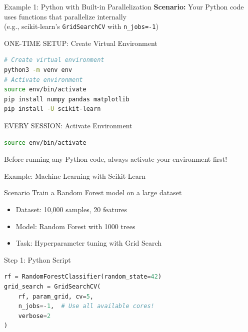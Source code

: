 \documentclass[aspectratio=169]{beamer}
\begin{document}
\begin{frame}[fragile]{Example 1: Python with Built-in Parallelization}
\textbf{Scenario:} Your Python code uses functions that parallelize internally\\
(e.g., scikit-learn's \texttt{GridSearchCV} with \texttt{n\_jobs=-1})

\begin{block}{ONE-TIME SETUP: Create Virtual Environment}
\begin{lstlisting}[language=bash]
# Create virtual environment
python3 -m venv env
# Activate environment
source env/bin/activate
pip install numpy pandas matplotlib
pip install -U scikit-learn
\end{lstlisting}
\end{block}

\begin{alertblock}{EVERY SESSION: Activate Environment}
\begin{lstlisting}[language=bash]
source env/bin/activate
\end{lstlisting}
Before running any Python code, always activate your environment first!
\end{alertblock}

\end{frame}

\begin{frame}{Example: Machine Learning with Scikit-Learn}
\begin{block}{Scenario}
Train a Random Forest model on a large dataset
\begin{itemize}
    \item Dataset: 10,000 samples, 20 features
    \item Model: Random Forest with 1000 trees
    \item Task: Hyperparameter tuning with Grid Search
\end{itemize}
\end{block}

\end{frame}

\begin{frame}[fragile]{Step 1: Python Script}
\begin{lstlisting}[language=Python]
rf = RandomForestClassifier(random_state=42)
grid_search = GridSearchCV(
    rf, param_grid, cv=5, 
    n_jobs=-1,  # Use all available cores!
    verbose=2
)
\end{lstlisting}
\end{frame}
\end{document}

